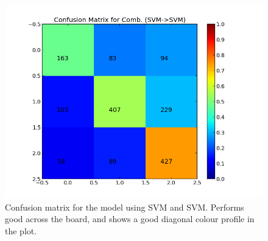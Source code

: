\begin{minipage}[!htb]{\linewidth}
\begin{minipage}{0.45\linewidth}
\begin{figure}[H]
                \includegraphics[width=\linewidth]{../img/plots/grid/confusion_matrix_Comb-SVM-SVM.png}
         		\caption[Plot showing the confusion matrix for two-step SVM -> SVM]{Confusion matrix for the model using SVM and SVM. Performs good across the board, and shows a good diagonal colour profile in the plot.}
            \label{fig:confmat_svm_svm}
           \end{figure}
      \end{minipage} \\
 \end{minipage}
 
